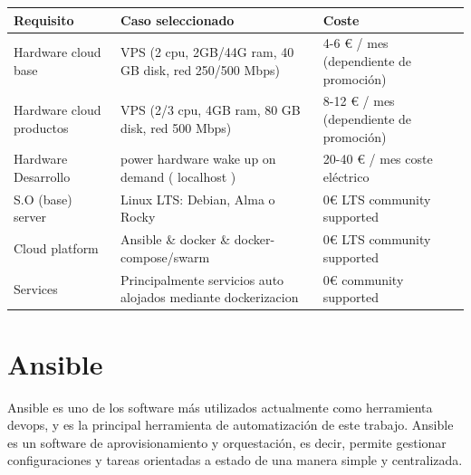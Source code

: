 \begin{table}[!ht]
    \centering
    \begin{tabular}{|p{4cm}|p{5cm}|p{5cm}|}
    \hline
        \textbf{Requisito} & \textbf{Caso seleccionado} & \textbf{Coste} \\ \hline
        Hardware cloud base & VPS (2 cpu, 2GB/44G ram, 40 GB disk, red  250/500 Mbps) & 4-6 € / mes (dependiente de promoción) \cite{c_vps_ovh} \\ \hline
        Hardware cloud productos & VPS (2/3 cpu, 4GB ram, 80 GB disk, red  500 Mbps) & 8-12 € / mes (dependiente de promoción) \cite{c_vps_time4vps} \\ \hline
        Hardware Desarrollo & power hardware wake up on demand ( localhost ) & 20-40 € / mes coste eléctrico \\ \hline
        S.O (base) server & Linux LTS: Debian, Alma o Rocky & 0€ LTS community supported \\ \hline
        Cloud platform & Ansible \& docker \& docker-compose/swarm  & 0€ LTS community supported \\ \hline
        Services & Principalmente servicios auto alojados mediante dockerizacion & 0€ community supported \\ \hline
    \end{tabular}
\end{table}

\section{Ansible}
Ansible\cite{c_ansible} es uno de los software más utilizados actualmente como herramienta devops,  y es la principal herramienta de automatización de este trabajo. Ansible es un software de aprovisionamiento y orquestación, es decir, permite gestionar configuraciones y tareas orientadas a estado de una manera simple y centralizada.

